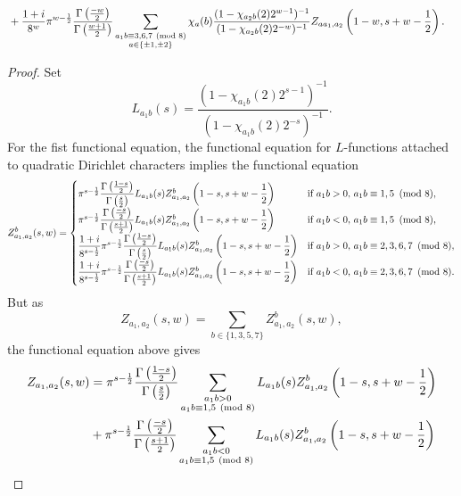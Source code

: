 \documentclass[12pt,reqno,oneside]{amsart}
\begin{document}
\begin{theorem}
\begin{align*}
            &+\frac{1+i}{8^{w}}\pi^{w-\frac{1}{2}}\frac{\Gamma\left(\frac{-w}{2}\right)}{\Gamma\left(\frac{w+1}{2}\right)}\sum_{\substack{a_{1}b \equiv 3,6,7 \ \left(\text{mod }8\right) \\ a \in \{\pm1,\pm2\}}}\chi_{a}(b)\frac{(1-\chi_{a_{2}b}(2)2^{w-1})^{-1}}{(1-\chi_{a_{2}b}(2)2^{-w})^{-1}}Z_{aa_{1},a_{2}}\left(1-w,s+w-\frac{1}{2}\right).
        \end{align*}
    \end{theorem}
    \begin{proof}
        Set
        \[
            L_{a_{1}b}(s) = \frac{(1-\chi_{a_{1}b}(2)2^{s-1})^{-1}}{(1-\chi_{a_{1}b}(2)2^{-s})^{-1}}.
        \]
        For the fist functional equation, the functional equation for $L$-functions attached to quadratic Dirichlet characters implies the functional equation
        \[
            Z_{a_{1},a_{2}}^{b}(s,w) = \begin{cases} \pi^{s-\frac{1}{2}}\dfrac{\Gamma\left(\frac{1-s}{2}\right)}{\Gamma\left(\frac{s}{2}\right)}L_{a_{1}b}(s)Z_{a_{1},a_{2}}^{b}\left(1-s,s+w-\dfrac{1}{2}\right) & \text{if $a_{1}b > 0$, $a_{1}b \equiv 1,5 \ \left(\text{mod }8\right)$}, \\ \pi^{s-\frac{1}{2}}\dfrac{\Gamma\left(\frac{-s}{2}\right)}{\Gamma\left(\frac{s+1}{2}\right)}L_{a_{1}b}(s)Z_{a_{1},a_{2}}^{b}\left(1-s,s+w-\dfrac{1}{2}\right) & \text{if $a_{1}b < 0$, $a_{1}b \equiv 1,5 \ \left(\text{mod }8\right)$}, \\ \dfrac{1+i}{8^{s-\frac{1}{2}}}\pi^{s-\frac{1}{2}}\dfrac{\Gamma\left(\frac{1-s}{2}\right)}{\Gamma\left(\frac{s}{2}\right)}L_{a_{1}b}(s)Z_{a_{1},a_{2}}^{b}\left(1-s,s+w-\dfrac{1}{2}\right) & \text{if $a_{1}b > 0$, $a_{1}b \equiv 2,3,6,7 \ \left(\text{mod }8\right)$}, \\ \dfrac{1+i}{8^{s-\frac{1}{2}}}\pi^{s-\frac{1}{2}}\dfrac{\Gamma\left(\frac{-s}{2}\right)}{\Gamma\left(\frac{s+1}{2}\right)}L_{a_{1}b}(s)Z_{a_{1},a_{2}}^{b}\left(1-s,s+w-\dfrac{1}{2}\right) & \text{if $a_{1}b < 0$, $a_{1}b \equiv 2,3,6,7 \ \left(\text{mod }8\right)$}. \end{cases}
        \]
        But as
        \[
            Z_{a_{1},a_{2}}(s,w) = \sum_{b \in \{1,3,5,7\}}Z_{a_{1},a_{2}}^{b}(s,w),
        \]
        the functional equation above gives
        \begin{align*}
            Z_{a_{1},a_{2}}(s,w) &= \pi^{s-\frac{1}{2}}\frac{\G\left(\frac{1-s}{2}\right)}{\G\left(\frac{s}{2}\right)}\sum_{\substack{a_{1}b > 0 \\ a_{1}b \equiv 1,5 \tmod{8}}}L_{a_{1}b}(s)Z_{a_{1},a_{2}}^{b}\left(1-s,s+w-\frac{1}{2}\right) \\
            &+\pi^{s-\frac{1}{2}}\frac{\G\left(\frac{-s}{2}\right)}{\G\left(\frac{s+1}{2}\right)}\sum_{\substack{a_{1}b < 0 \\ a_{1}b \equiv 1,5 \tmod{8}}}L_{a_{1}b}(s)Z_{a_{1},a_{2}}^{b}\left(1-s,s+w-\frac{1}{2}\right) \\

\end{align*}
\end{proof}
\end{document}
